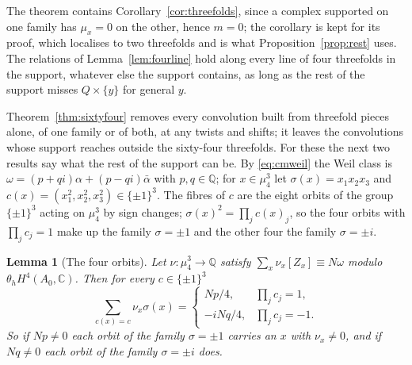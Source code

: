 \documentclass[11pt,reqno]{amsart}
\numberwithin{equation}{section}
\theoremstyle{plain}
\newtheorem{lemma}[theorem]{Lemma}
\theoremstyle{definition}
\newcommand{\QQ}{\mathbb{Q}}
\newcommand{\CC}{\mathbb{C}}
\begin{document}
The theorem contains Corollary~\ref{cor:threefolds}, since a complex supported on one family has $\mu_{x}=0$ on the other, hence $m=0$; the corollary is kept for its proof, which localises to two threefolds and is what Proposition~\ref{prop:rest} uses. The relations of Lemma~\ref{lem:fourline} hold along every line of four threefolds in the support, whatever else the support contains, as long as the rest of the support misses $Q\times\{y\}$ for general $y$.

Theorem~\ref{thm:sixtyfour} removes every convolution built from threefold pieces alone, of one family or of both, at any twists and shifts; it leaves the convolutions whose support reaches outside the sixty-four threefolds. For these the next two results say what the rest of the support can be. By \eqref{eq:cmweil} the Weil class is $\omega=(p+qi)\alpha+(p-qi)\bar\alpha$ with $p,q\in\QQ$; for $x\in\mu_{4}^{3}$ let $\sigma(x)=x_{1}x_{2}x_{3}$ and $c(x)=(x_{1}^{2},x_{2}^{2},x_{3}^{2})\in\{\pm1\}^{3}$. The fibres of $c$ are the eight orbits of the group $\{\pm1\}^{3}$ acting on $\mu_{4}^{3}$ by sign changes; $\sigma(x)^{2}=\prod_{j}c(x)_{j}$, so the four orbits with $\prod_{j}c_{j}=1$ make up the family $\sigma=\pm1$ and the other four the family $\sigma=\pm i$.

\begin{lemma}[The four orbits]\label{lem:orbits}
Let $\nu\colon\mu_{4}^{3}\to\QQ$ satisfy $\sum_{x}\nu_{x}[Z_{x}]\equiv N\omega$ modulo $\theta_{h}H^{4}(A_{0},\CC)$. Then for every $c\in\{\pm1\}^{3}$
\[
\sum_{c(x)=c}\nu_{x}\sigma(x)=\begin{cases}Np/4,&\prod_{j}c_{j}=1,\\ -iNq/4,&\prod_{j}c_{j}=-1.\end{cases}
\]
So if $Np\ne0$ each orbit of the family $\sigma=\pm1$ carries an $x$ with $\nu_{x}\ne0$, and if $Nq\ne0$ each orbit of the family $\sigma=\pm i$ does.
\end{lemma}
\end{document}
